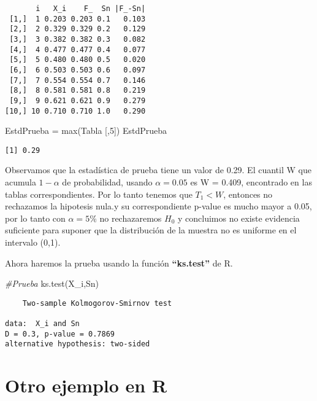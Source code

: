 \documentclass[
  a4paper,
  oneside,
  openany]{book}
\newenvironment{Shaded}{\begin{snugshade}}{\end{snugshade}}
\newcommand{\CommentTok}[1]{\textcolor[rgb]{0.56,0.35,0.01}{\textit{#1}}}
\newcommand{\DecValTok}[1]{\textcolor[rgb]{0.00,0.00,0.81}{#1}}
\newcommand{\FunctionTok}[1]{\textcolor[rgb]{0.00,0.00,0.00}{#1}}
\newcommand{\NormalTok}[1]{#1}
\newcommand{\OtherTok}[1]{\textcolor[rgb]{0.56,0.35,0.01}{#1}}
\begin{document}
\begin{verbatim}
       i   X_i    F_  Sn |F_-Sn|
 [1,]  1 0.203 0.203 0.1   0.103
 [2,]  2 0.329 0.329 0.2   0.129
 [3,]  3 0.382 0.382 0.3   0.082
 [4,]  4 0.477 0.477 0.4   0.077
 [5,]  5 0.480 0.480 0.5   0.020
 [6,]  6 0.503 0.503 0.6   0.097
 [7,]  7 0.554 0.554 0.7   0.146
 [8,]  8 0.581 0.581 0.8   0.219
 [9,]  9 0.621 0.621 0.9   0.279
[10,] 10 0.710 0.710 1.0   0.290
\end{verbatim}

\begin{Shaded}
\begin{Highlighting}[]
\NormalTok{EstdPrueba }\OtherTok{=} \FunctionTok{max}\NormalTok{(Tabla [,}\DecValTok{5}\NormalTok{])}
\NormalTok{EstdPrueba}
\end{Highlighting}
\end{Shaded}

\begin{verbatim}
[1] 0.29
\end{verbatim}

Observamos que la estadística de prueba tiene un valor de 0.29. El cuantil W que acumula \(1-\alpha\) de probabilidad, usando \(\alpha=0.05\) es W = 0.409, encontrado en las tablas correspondientes. Por lo tanto tenemos que \(T_1 < W\), entonces no rechazamos la hipotesis nula.y su correspondiente p-value es mucho mayor a 0.05, por lo tanto con \(\alpha=5\%\) no rechazaremos \(H_0\) y concluimos no existe evidencia suficiente para suponer que la distribución de la muestra no es uniforme en el intervalo (0,1).

Ahora haremos la prueba usando la función \textbf{``ks.test''} de R.

\begin{Shaded}
\begin{Highlighting}[]
\CommentTok{\#Prueba}
\FunctionTok{ks.test}\NormalTok{(X\_i,Sn)}
\end{Highlighting}
\end{Shaded}

\begin{verbatim}
    Two-sample Kolmogorov-Smirnov test

data:  X_i and Sn
D = 0.3, p-value = 0.7869
alternative hypothesis: two-sided
\end{verbatim}

\hypertarget{otro-ejemplo-en-r}{%
\section{Otro ejemplo en R}\label{otro-ejemplo-en-r}}
\end{document}
